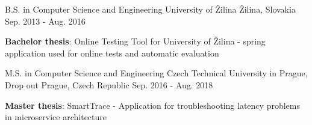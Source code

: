 

\begin{cventries}
  \cventry
  {B.S. in Computer Science and Engineering} %
  {University of Žilina} %
  {Žilina, Slovakia} %
  {Sep. 2013 - Aug. 2016} %
  {
    \begin{cvitems} %
      \item {\textbf{Bachelor thesis}: Online Testing Tool for University of Žilina - spring application used for online tests and automatic evaluation}
    \end{cvitems}
  }

  \vspace{5pt}
  \cventry
  {M.S. in Computer Science and Engineering} %
  {Czech Technical University in Prague, Drop out} %
  {Prague, Czech Republic} %
  {Sep. 2016 - Aug. 2018} %
  {
    \begin{cvitems} %
      \item {\textbf{Master thesis}: SmartTrace - Application for troubleshooting latency problems in microservice architecture}
    \end{cvitems}
  }

\end{cventries}
